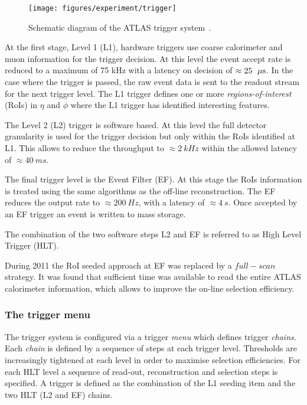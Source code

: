\begin{figure}[ht]
\begin{center}
\texttt{[image: figures/experiment/trigger]}
\caption[ATLAS trigger system]{
  Schematic diagram of the ATLAS trigger system~\cite{trigger}. }
\label{fig:trigger}
\end{center}
\end{figure}

At the first stage, Level 1 (L1), hardware triggers use coarse
calorimeter and muon information for the trigger decision. At this
level the event accept rate is reduced to a maximum of 75 kHz with a
latency on decision of $\approx{}25~\; \mu\mathrm{s}{}$. In the case where the
trigger is passed, the raw event data is sent to the readout stream
for the next trigger level. The L1 trigger defines one or more
\emph{regions-of-interest} (RoIs) in $\eta{}$ and $\phi{}$ where the
L1 trigger has identified interesting features. 

The Level 2 (L2) trigger is software based. At this level the full detector
granularity is used for the trigger decision but only within the RoIs
identified at L1. This allows to reduce the throughput to
$\approx{}2~kHz$ within the allowed latency of $\approx{}40~ms$.

The final trigger level is the Event Filter (EF). At this stage the RoIs
information is treated using the same algorithms as the off-line
reconstruction. The EF reduces the output rate to $\approx{}200~Hz$, 
with a latency of $\approx{}4~s$. Once accepted by an EF trigger an
event is written to mass storage.

The combination of the two software steps L2 and EF is referred to as High Level Trigger (HLT).

During 2011 the RoI seeded approach at EF was replaced by a
$full-scan$ strategy. It was found that sufficient time was available
to read the entire ATLAS calorimeter information, which allows to
improve the on-line selection efficiency.

\subsubsection{The trigger menu}

The trigger system is configured via a trigger \textit{menu} which defines trigger \textit{chains}.
Each \textit{chain} is defined by a sequence of steps at each trigger level.
Thresholds are increasingly tightened at each level in order to maximise selection efficiencies.
For each HLT level a sequence of read-out, reconstruction and selection steps is specified.
A trigger is defined as the combination of the L1 seeding item and the two HLT (L2 and EF) chains.

